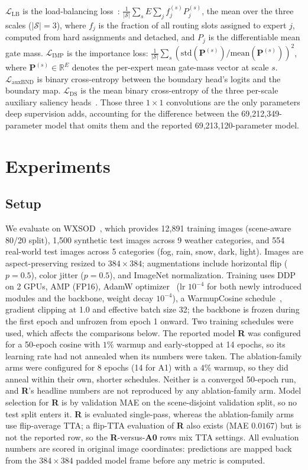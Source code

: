 \documentclass[10pt,a4paper,twocolumn,twoside]{article}
\newcommand{\bP}{\mathbf{P}}
\newcommand{\reals}{\mathbb{R}}
\begin{document}
$\mathcal{L}_{\text{LB}}$ is the load-balancing loss~\cite{shazeer2017moe}:
$\frac{1}{|\mathcal{S}|}\sum_{s} E \sum_j f_j^{(s)} P_j^{(s)}$, the mean over the three scales ($|\mathcal{S}|=3$), where $f_j$ is the fraction of all routing slots assigned to expert $j$, computed from hard assignments and detached, and $P_j$ is the differentiable mean gate mass.
$\mathcal{L}_{\text{IMP}}$ is the importance loss:
$\frac{1}{|\mathcal{S}|}\sum_{s} (\text{std}(\bP^{(s)}) / \text{mean}(\bP^{(s)}))^2$, where $\bP^{(s)} \in \reals^E$ denotes the per-expert mean gate-mass vector at scale $s$.
$\mathcal{L}_{\text{auxBND}}$ is binary cross-entropy between the boundary head's logits and the boundary map.
$\mathcal{L}_{\text{DS}}$ is the mean binary cross-entropy of the three per-scale auxiliary saliency heads~\cite{lee2015dsn}. Those three $1{\times}1$ convolutions are the only parameters deep supervision adds, accounting for the difference between the 69{,}212{,}349-parameter model that omits them and the reported 69{,}213{,}120-parameter model.

\section{Experiments}
\label{sec:exp}

\subsection{Setup}
We evaluate on WXSOD~\cite{wxsod2025}, which provides 12,891 training images (scene-aware 80/20 split), 1,500 synthetic test images across 9 weather categories, and 554 real-world test images across 5 categories (fog, rain, snow, dark, light).
Images are aspect-preserving resized to $384{\times}384$; augmentations include horizontal flip ($p{=}0.5$), color jitter ($p{=}0.5$), and ImageNet normalization.
Training uses DDP on 2 GPUs, AMP (FP16), AdamW optimizer~\cite{loshchilov2019adamw} (lr $10^{-4}$ for both newly introduced modules and the backbone, weight decay $10^{-4}$), a WarmupCosine schedule~\cite{loshchilov2017sgdr}, gradient clipping at 1.0 and effective batch size 32; the backbone is frozen during the first epoch and unfrozen from epoch 1 onward.
Two training schedules were used, which affects the comparisons below. The reported model \textbf{R} was configured for a 50-epoch cosine with $1\%$ warmup and early-stopped at 14 epochs, so its learning rate had not annealed when its numbers were taken. The ablation-family arms were configured for 8 epochs (14 for A1) with a $4\%$ warmup, so they did anneal within their own, shorter schedules. Neither is a converged 50-epoch run, and \textbf{R}'s headline numbers are not reproduced by any ablation-family arm.
Model selection for \textbf{R} is by validation MAE on the scene-disjoint validation split, so no test split enters it. \textbf{R} is evaluated single-pass, whereas the ablation-family arms use flip-average TTA; a flip-TTA evaluation of \textbf{R} also exists (MAE $0.0167$) but is not the reported row, so the \textbf{R}-versus-\textbf{A0} rows mix TTA settings.
All evaluation numbers are scored in original image coordinates: predictions are mapped back from the $384{\times}384$ padded model frame before any metric is computed.
\end{document}
